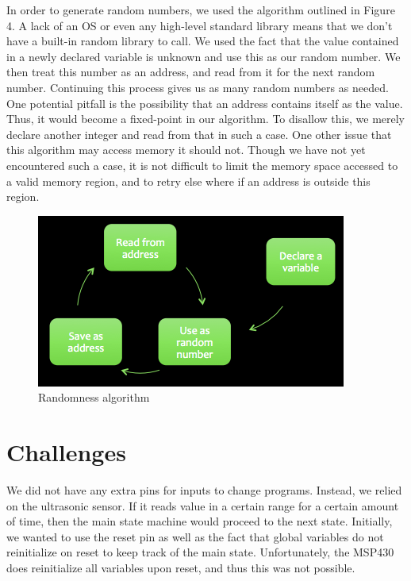 \documentclass[10pt,titlepage]{article}
\begin{document}
  In order to generate random numbers, we used the algorithm outlined in Figure 4. A lack of an OS or even any high-level standard library means that we don't have a built-in random library to call. We used the fact that the value contained in a newly declared variable is unknown and use this as our random number. We then treat this number as an address, and read from it for the next random number. Continuing this process gives us as many random numbers as needed. One potential pitfall is the possibility that an address contains itself as the value. Thus, it would become a fixed-point in our algorithm. To disallow this, we merely declare another integer and read from that in such a case. One other issue that this algorithm may access memory it should not. Though we have not yet encountered such a case, it is not difficult to limit the memory space accessed to a valid memory region, and to retry else where if an address is outside this region.\\
  \begin{figure}[h!]
      \centering
      \includegraphics[width=\textwidth]{ran.png}
      \caption{Randomness algorithm}
  \end{figure}

  \section*{Challenges}
  We did not have any extra pins for inputs to change programs. Instead, we relied on the ultrasonic sensor. If it reads value in a certain range for a certain amount of time, then the main state machine would proceed to the next state. Initially, we wanted to use the reset pin as well as the fact that global variables do not reinitialize on reset to keep track of the main state. Unfortunately, the MSP430 does reinitialize all variables upon reset, and thus this was not possible. \\
  
\end{document}
